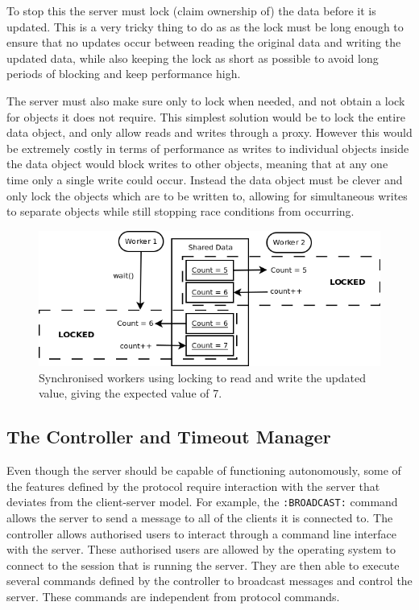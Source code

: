 To stop this the server must lock (claim ownership of) the data before it is updated. This is a very tricky thing to do as as the lock must be long enough to ensure that no updates occur between reading the original data and writing the updated data, while also keeping the lock as short as possible to avoid long periods of blocking and keep performance high.

The server must also make sure only to lock when needed, and not obtain a lock for objects it does not require. This simplest solution would be to lock the entire data object, and only allow reads and writes through a proxy. However this would be extremely costly in terms of performance as writes to individual objects inside the data object would block writes to other objects, meaning that at any one time only a single write could occur. Instead the data object must be clever and only lock the objects which are to be written to, allowing for simultaneous writes to separate objects while still stopping race conditions from occurring.

\begin{figure}
    \begin{center}
        \includegraphics[scale=0.6]{Design/diagrams/server_locking.png}
        \caption{Synchronised workers using locking to read and write the updated value, giving the expected value of 7.}
        \label{lockingDia}
    \end{center}
\end{figure}

\subsection{The Controller and Timeout Manager}
Even though the server should be capable of functioning autonomously, some of the features defined by the protocol require interaction with the server that deviates from the client-server model. For example, the \texttt{:BROADCAST:} command allows the server to send a message to all of the clients it is connected to. The controller allows authorised users to interact through a command line interface with the server. These authorised users are allowed by the operating system to connect to the session that is running the server. They are then able to execute several commands defined by the controller to broadcast messages and control the server. These commands are independent from protocol commands.

